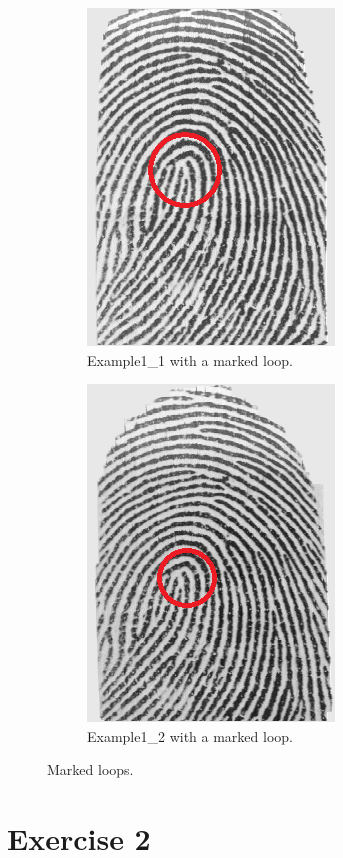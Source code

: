\documentclass[a4paper]{article}
\begin{document}
\begin{figure}[h!]
  \centering
       \begin{subfigure}[t]{0.45\textwidth}
         \centering
         \includegraphics[scale=0.6]{Figures/example1_marked}
         \caption{Example1\_1 with a marked loop.}
     \end{subfigure}%
     \quad
     \begin{subfigure}[t]{0.45\textwidth}
         \centering
         \includegraphics[scale=0.6]{Figures/example2_marked}
         \caption{Example1\_2 with a marked loop.}
     \end{subfigure}
    \caption{Marked loops.}
    \label{fig:ex1b}
\end{figure}

\section{Exercise 2}
\end{document}
